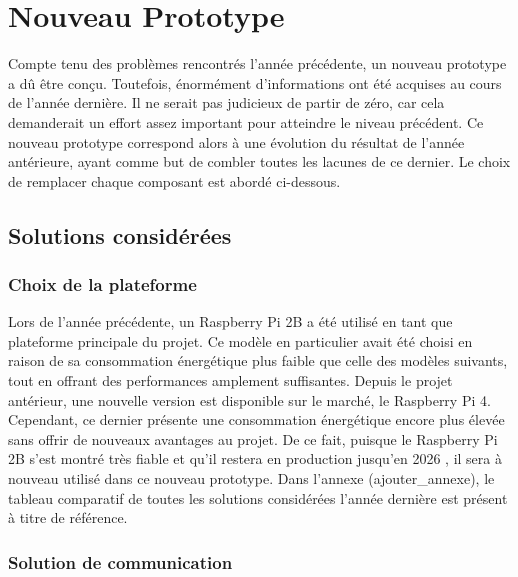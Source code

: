 
\section{Nouveau Prototype}

Compte tenu des problèmes rencontrés l'année précédente, un nouveau prototype a dû être conçu. Toutefois, énormément d'informations ont été acquises au cours de l'année dernière. Il ne serait pas judicieux de partir de zéro, car cela demanderait un effort assez important pour atteindre le niveau précédent. Ce nouveau prototype correspond alors à une évolution du résultat de l'année antérieure, ayant comme but de combler toutes les lacunes de ce dernier. Le choix de remplacer chaque composant est abordé ci-dessous.

\subsection{Solutions considérées}

\subsubsection{Choix de la plateforme}

Lors de l'année précédente, un Raspberry Pi 2B a été utilisé en tant que plateforme principale du projet. Ce modèle en particulier avait été choisi en raison de sa consommation énergétique plus faible que celle des modèles suivants, tout en offrant des performances amplement suffisantes. Depuis le projet antérieur, une nouvelle version est disponible sur le marché, le Raspberry Pi 4. Cependant, ce dernier présente une consommation énergétique encore plus élevée sans offrir de nouveaux avantages au projet. De ce fait, puisque le Raspberry Pi 2B s'est montré très fiable et qu'il restera en production jusqu'en 2026 \cite{rasp_prod}, il sera à nouveau utilisé dans ce nouveau prototype. Dans l'annexe (ajouter\_annexe), le tableau comparatif de toutes les solutions considérées l'année dernière est présent à titre de référence.


\subsubsection{Solution de communication}


